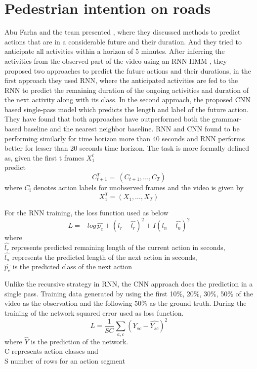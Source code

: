 \section{Pedestrian intention on roads}
\newpara Abu Farha and the team presented \cite{abu2018will}, where they discussed methods to predict actions that are in a considerable future and their duration. And they tried to anticipate all activities within a horizon of 5 minutes. After inferring the activities from the observed part of the video using an RNN-HMM \cite{richard2017weakly}, they proposed two approaches to predict the future actions and their durations, in the first approach they used RNN, where the anticipated activities are fed to the RNN to predict the remaining duration of the ongoing activities and duration of the next activity along with its class.
In the second approach, the proposed CNN based single-pass model which predicts the length and label of the future action. They have found that both approaches have outperformed both the grammar-based baseline and the nearest neighbor baseline. RNN and CNN found to be performing similarly for time horizon more than 40 seconds and RNN performs better for lesser than 20 seconds time horizon. The task is more formally defined as,
given the first t frames $X_{\text{1}}^t$ \\
predict \[ C_{t+1}^T  = \ (C_{t+1}, ..., C_{T}) \]
where $C_{\text{i}}$ denotes action labels for unobserved frames
and the video is given by
\[ X_{1}^T = (X_{1}, ..., X_{T}) \]

\newpara
For the RNN training, the loss function used as below
\begin{equation}
    L = -log\, \hat{p_c} + (l_r - \hat{l_r})^2 +  I (l_n - \hat{l_n})^2 
\end{equation}
where \\
$\hat{l_r}$ represents predicted remaining length of the current action in seconds, \\
$\hat{l_n}$ represents the predicted length of the next action in seconds, \\
$\hat{p_c}$ is the predicted class of the next action

\newpara Unlike the recursive strategy in RNN, the CNN approach does the prediction in a single pass.
Training data generated by using the first 10\%, 20\%, 30\%, 50\% of the video as the observation and the following 50\% as the ground truth. During the training of the network squared error used as loss function.
\begin{equation}
    L = \frac{1} {SC} \sum_{a,c} (Y_{sc} - \hat{Y_{sc}})^2 
\end{equation}
where $\hat{Y}$ is the prediction of the network. \\
C represents action classes and \\
S number of rows for an action segment

